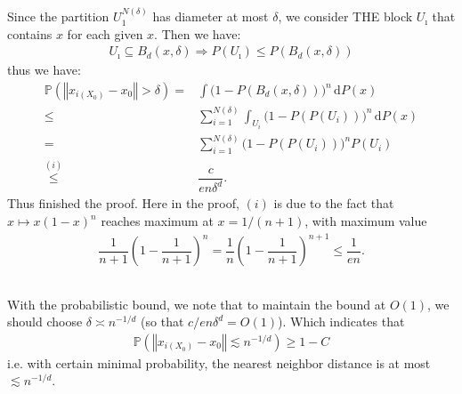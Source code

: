 \documentclass[11pt,a4paper]{ctexart}
\numberwithin{equation}{section}%
\begin{document}
\subsection{}

Since the partition $ U_1^{N(\delta )} $ has diameter at most $ \delta  $, we consider THE block $ U_\imath $ that contains $ x $ for each given $ x $. Then we have:
\begin{align*}
    U_\imath \subseteq B_d(x,\delta ) \Rightarrow P\left( U_\imath  \right) \leq P\left( B_d(x,\delta ) \right)
\end{align*}
thus we have:
\begin{align*}
    \mathbb{P}\left( \left\Vert x_{i(X_0)}-x_0 \right\Vert >\delta   \right) =& \int \big( 1- P\left( B_d(x,\delta ) \right)  \big) ^n \,\mathrm{d}P(x) \\
    \leq & \sum_{i=1}^{N(\delta )} \int_{U_i} \big( 1- P\left( P\left( U_i \right) \right)  \big) ^n \,\mathrm{d}P(x) \\
    =&  \sum_{i=1}^{N(\delta )}\big( 1- P\left( P\left( U_i \right) \right)  \big) ^nP\left( U_i \right) \\
    \mathop{ \leq }\limits^{(i)} & \dfrac{ c }{ en\delta ^d }.
\end{align*}
Thus finished the proof. Here in the proof, $ (i) $ is due to the fact that $ x\mapsto x(1-x)^n $ reaches maximum at $ x=1/(n+1) $, with maximum value
\begin{align*}
     \dfrac{ 1 }{ n+1 }(1-\dfrac{ 1 }{ n+1 })^n = \dfrac{ 1 }{ n } \left( 1-\dfrac{ 1 }{ n+1 } \right)^{n+1} \leq \dfrac{ 1 }{ en }.
\end{align*}

\subsection{}

With the probabilistic bound, we note that to maintain the bound at $ O(1) $, we should choose $ \delta  \asymp n^{-1/d} $ (so that $ c/en\delta ^d= O(1) $). Which indicates that 
\begin{align*}
    \mathbb{P}\left( \left\Vert x_{i(X_0)}-x_0 \right\Vert \lesssim n^{-1/d}  \right) \geq 1- C 
\end{align*}
i.e. with certain minimal probability, the nearest neighbor distance is at most $ \lesssim n^{-1/d} $.


\section{}
\end{document}
